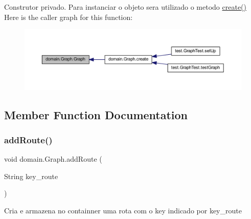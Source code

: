 Construtor privado. Para instanciar o objeto sera utilizado o metodo \hyperlink{classdomain_1_1_graph_a57ce4efd344c059a565f4bb104fdee64}{create()} Here is the caller graph for this function\+:\nopagebreak
\begin{figure}[H]
\begin{center}
\leavevmode
\includegraphics[width=350pt]{classdomain_1_1_graph_a656a81cf9b9638f21e9d582f397b7a06_icgraph}
\end{center}
\end{figure}


\subsection{Member Function Documentation}
\mbox{\label{classdomain_1_1_graph_a2ecd9722f3cbb7d97fda519101d249ed}} 
\subsubsection{\texorpdfstring{add\+Route()}{addRoute()}\hspace{0.1cm}{\footnotesize\ttfamily [1/2]}}
{\footnotesize\ttfamily void domain.\+Graph.\+add\+Route (\begin{DoxyParamCaption}\item[{String}]{key\+\_\+route }\end{DoxyParamCaption})}

Cria e armazena no containner uma rota com o key indicado por key\+\_\+route


